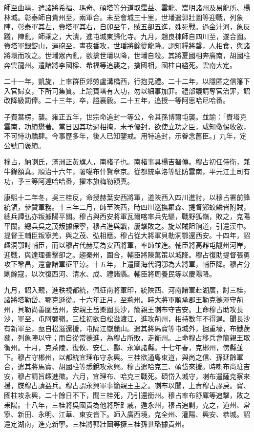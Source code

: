 \begin{pinyinscope}
師至曲靖，遣諸將希福、瑪奇、碩塔等分道取霑益、雲龍、嵩明諸州及易龍所、楊林城。彰泰師自貴州至，兩軍合。未至會城三十里，世璠遣郭壯圖等迎戰，列象陣，彰泰軍其左，賚塔軍其右，自卯至午，賊五卻五進，殊死戰。過金汁河，象反踐，陣亂，師乘之，大潰，進屯城東歸化寺。九月，趙良棟師自四川至，遂合圍。賚塔軍銀錠山，運砲至，晝夜番攻，世璠將餘從龍降。詗知糧將罄，人相食，與諸將環而攻之。世璠眾內亂，欲擒世璠以降，世璠自殺。其將夏國相奔廣南，胡國柱奔雲龍州。遣諸將李國樑、希福等追襲之，擒國相，國柱自縊死。雲南大定。

二十一年，凱旋，上率群臣郊勞盧溝橋西，行抱見禮。二十二年，以隱匿之信籓下入官婦女，下所司集質。上諭賚塔有大功，勿以細事加罪。禮部議請奪官治罪，詔改降級罰俸。二十三年，卒，謚襄毅。二十五年，追授一等阿思哈尼哈番。

子費葉楞，襲。雍正五年，世宗命追封一等公，令其孫博爾屯襲。並諭：「賚塔克雲南，功績懋著。當日因其功過相掩，未予優封，欲使立功之臣，咸知儆惕收斂，不可恃功驕肆。今事歷多年，後人已知鑒戒。用特追封，示眷念舊臣。」九年，定公號曰褒績。

穆占，納喇氏，滿洲正黃旗人，南楮子也。南楮事具楊吉砮傳。穆占初任侍衛，兼牛錄額真。順治十六年，署噶布什賢章京。從都統卓洛等駐防雲南，平元江土司有功，予三等阿達哈哈番，擢本旗梅勒額真。

康熙十二年冬，吳三桂反，命授赫葉安西將軍，道陜西入四川進討，以穆占署前鋒統領，參贊軍務。十三年二月，師至陜西，時四川巡撫羅森、提督鄭蛟麟皆附賊，總兵譚弘亦叛據陽平關。穆占與西安將軍瓦爾喀率兵先驅，戰野狐嶺，敗之，克陽平關。總兵吳之茂叛據保寧，穆占進與戰，屢擊敗之。旋以賊阻餉道，引還漢中。提督王輔臣叛寧羌，與之茂、弘相應。穆占從大將軍貝勒洞鄂還西安。十四年，詔趣洞鄂討輔臣，而以穆占代赫葉為安西將軍，率師並進。輔臣將高鼎屯隴州河岸，迎戰，與達理善擊卻之。趨秦州，圍合，輔臣將陳萬策以城降。穆占復助提督張勇攻下鞏昌，還會諸軍征平涼。十五年，上遣圖海代洞鄂為大將軍，輔臣降。穆占分剿餘寇，以次復西河、清水、成、禮諸縣。輔臣將周養民等以慶陽降。

九月，詔入覲，進秩視都統，佩征南將軍印，統陜西、河南諸軍赴湖廣，討三桂，諸將塔勒岱、鄂克遜從。十六年正月，至荊州。時大將軍順承郡王勒克德渾守荊州，貝勒尚善圍岳州，安親王岳樂圍長沙，簡親王喇布守吉安。上命穆占助攻長沙，軍至，屯阿彌嶺。三桂初欲自松滋渡江，進攻荊州，相持數年不得逞。聞長沙有新軍至，亟自松滋還援，屯隔江嶽麓山。遣其將馬寶等屯城外，掘重壕，布鐵蒺藜，列象陣以守；而自從常德進，為穆占所敗，走衡州。上命穆占移兵會簡親王取衡州。十月，克茶陵，復攸、安仁、酃、永寧諸縣。十七年春，克郴州，傍縣並下。穆占守郴州，以都統宜理布守永興。三桂欲通粵東道，與尚之信、孫延齡軍合，遣其將馬寶、胡國柱等悉銳攻永興。穆占遣哈克三、碩岱來援。時喇布尚駐吉安，穆占請旨趣進徵。六月，宜理布、哈克三戰死。碩岱入城守，喇布遣薩克察來援，牒穆占請益兵。穆占謂永興軍事簡親王主之。喇布以聞，上責穆占謬戾。寶、國柱攻永興，二十餘日不下，聞三桂死，乃引還衡州。穆占率布舒庫等追擊，敗之耒陽。十八年，三桂將吳國貴為他將所𧾷戚，遁永州，穆占追剿，克之，道州、常寧、新田、永明、江華、東安皆下。師入廣西境，克全州、灌陽、興安、恭城。詔還定湖南，進克新寧。三桂將郭壯圖等擁三桂孫世璠據貴州。


\end{pinyinscope}
